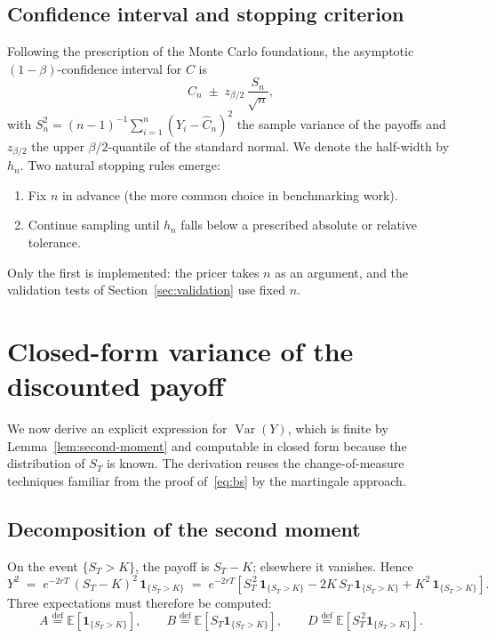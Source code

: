 \documentclass[11pt,a4paper]{article}
\theoremstyle{plain}
\theoremstyle{definition}
\theoremstyle{remark}
\newcommand{\E}{\mathbb{E}}
\newcommand{\Var}{\operatorname{Var}}
\newcommand{\eqdef}{\overset{\mathrm{def}}{=}}
\newcommand{\one}{\mathbf{1}}
\begin{document}
\subsection{Confidence interval and stopping criterion}

Following the prescription of the Monte Carlo foundations, the asymptotic
$(1-\beta)$-confidence interval for $C$ is
\begin{equation}
\label{eq:CI}
\hat{C}_n \;\pm\; z_{\beta/2}\,\frac{S_n}{\sqrt{n}},
\end{equation}
with $S_n^2 = (n-1)^{-1}\sum_{i=1}^n (Y_i - \hat{C}_n)^2$ the sample
variance of the payoffs and $z_{\beta/2}$ the upper $\beta/2$-quantile
of the standard normal. We denote the half-width by $h_n$. Two natural
stopping rules emerge:
\begin{enumerate}
\item Fix $n$ in advance (the more common choice in benchmarking work).
\item Continue sampling until $h_n$ falls below a prescribed
absolute or relative tolerance.
\end{enumerate}
Only the first is implemented: the pricer takes $n$ as an argument, and
the validation tests of Section~\ref{sec:validation} use fixed $n$.

\section{Closed-form variance of the discounted payoff}
\label{sec:variance}

We now derive an explicit expression for $\Var(Y)$, which is finite by
Lemma~\ref{lem:second-moment} and computable in closed form because the
distribution of $S_T$ is known. The derivation reuses the
change-of-measure techniques familiar from the proof of~\eqref{eq:bs}
by the martingale approach.

\subsection{Decomposition of the second moment}

On the event $\{S_T > K\}$, the payoff is $S_T - K$; elsewhere it
vanishes. Hence
\begin{equation}
\label{eq:Y2-expansion}
Y^2 \;=\; e^{-2rT}\, (S_T - K)^2\, \one_{\{S_T > K\}}
\;=\; e^{-2rT}\!\left[
S_T^{\,2}\, \one_{\{S_T > K\}}
- 2K\, S_T\, \one_{\{S_T > K\}}
+ K^2\, \one_{\{S_T > K\}}
\right].
\end{equation}
Three expectations must therefore be computed:
\begin{equation}
A \eqdef \E[\one_{\{S_T > K\}}],
\qquad
B \eqdef \E[S_T \one_{\{S_T > K\}}],
\qquad
D \eqdef \E[S_T^{\,2} \one_{\{S_T > K\}}].
\end{equation}
\end{document}

